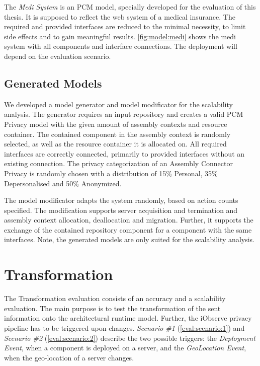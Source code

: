 The \textit{Medi System} is an PCM model, specially developed for the evaluation of this thesis. It is supposed to reflect the web system of a medical insurance. The required and provided interfaces are reduced to the minimal necessity, to limit side effects and to gain meaningful results. \autoref{fig:model:medi} shows the medi system with all components and interface connections. The deployment will depend on the evaluation scenario.


\subsection{Generated Models}
\label{sec:Evaluation:models:generated}

We developed a model generator and model modificator for the scalability analysis. The generator requires an input repository and creates a valid PCM Privacy model with the given amount of assembly contexts and resource container. The contained component in the assembly context is randomly selected, as well as the resource container it is allocated on. All required interfaces are correctly connected, primarily to provided interfaces without an existing connection. The privacy categorization of an Assembly Connector Privacy is randomly chosen with a distribution of 15\% Personal, 35\% Depersonalised and 50\% Anonymized.

The model modificator adapts the system randomly, based on action counts specified. The modification supports server acquisition and termination and assembly context allocation, deallocation and migration. Further, it supports the exchange of the contained repository component for a component with the same interfaces. Note, the generated models are only suited for the scalability analysis. 



\section{Transformation}
\label{sec:Evaluation:monitoring}

The Transformation evaluation consists of an accuracy and a scalability evaluation. The main purpose is to test the transformation of the sent information onto the architectural runtime model. Further, the iObserve privacy pipeline has to be triggered upon changes. \textit{Scenario \#1} (\autoref{eval:scenario:1}) and \textit{Scenario \#2} (\autoref{eval:scenario:2}) describe the two possible triggers: the \textit{Deployment Event}, when a component is deployed on a server, and the \textit{GeoLocation Event}, when the geo-location of a server changes. 

